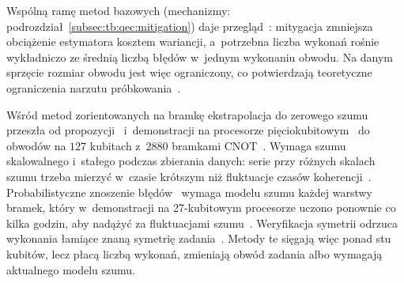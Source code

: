 Wspólną ramę metod bazowych (mechanizmy: podrozdział~\ref{subsec:tb:qec:mitigation}) daje przegląd~\cite{cai2023quantum}: mitygacja zmniejsza obciążenie estymatora kosztem wariancji, a~potrzebna liczba wykonań rośnie wykładniczo ze średnią liczbą błędów w~jednym wykonaniu obwodu.
Na danym sprzęcie rozmiar obwodu jest więc ograniczony, co potwierdzają teoretyczne ograniczenia narzutu próbkowania~\cite{takagi_fundamental_2022,quek_exponentially_2024}.

Wśród metod zorientowanych na bramkę ekstrapolacja do zerowego szumu przeszła od propozycji~\cite{richardson-extrapolation,quasi-probability} i~demonstracji na procesorze pięciokubitowym~\cite{kandala2021hardware} do obwodów na $127$ kubitach z~$2880$ bramkami CNOT~\cite{kim2023evidence}.
Wymaga szumu skalowalnego i~stałego podczas zbierania danych: serie przy różnych skalach szumu trzeba mierzyć w~czasie krótszym niż fluktuacje czasów koherencji~\cite{kandala2021hardware}.
Probabilistyczne znoszenie błędów~\cite{quasi-probability,endo_practical_2018} wymaga modelu szumu każdej warstwy bramek, który w~demonstracji na 27-kubitowym procesorze uczono ponownie co kilka godzin, aby nadążyć za fluktuacjami szumu~\cite{van_den_berg_probabilistic_2023}.
Weryfikacja symetrii odrzuca wykonania łamiące znaną symetrię zadania~\cite{bonet-monroig_low-cost_2018}.
Metody te sięgają więc ponad stu kubitów, lecz płacą liczbą wykonań, zmieniają obwód zadania albo wymagają aktualnego modelu szumu.

